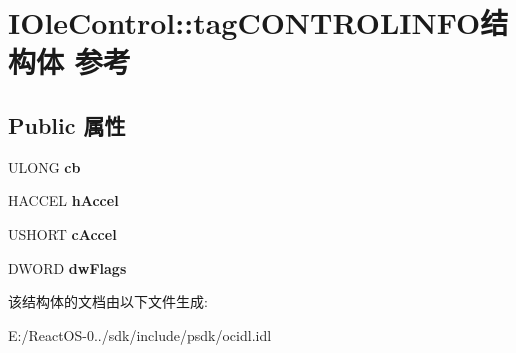 \hypertarget{struct_i_ole_control_1_1tag_c_o_n_t_r_o_l_i_n_f_o}{}\section{I\+Ole\+Control\+:\+:tag\+C\+O\+N\+T\+R\+O\+L\+I\+N\+F\+O结构体 参考}
\label{struct_i_ole_control_1_1tag_c_o_n_t_r_o_l_i_n_f_o}
\subsection*{Public 属性}
\begin{DoxyCompactItemize}
\item 
\mbox{\label{struct_i_ole_control_1_1tag_c_o_n_t_r_o_l_i_n_f_o_ac14aa7f3b4ac11bc6e73dceecc59d020}} 
U\+L\+O\+NG {\bfseries cb}
\item 
\mbox{\label{struct_i_ole_control_1_1tag_c_o_n_t_r_o_l_i_n_f_o_a7a132b9b62b9f8aefddced6b8f8f0316}} 
H\+A\+C\+C\+EL {\bfseries h\+Accel}
\item 
\mbox{\label{struct_i_ole_control_1_1tag_c_o_n_t_r_o_l_i_n_f_o_a5a7a344372a7aec7986678912c7a4b1d}} 
U\+S\+H\+O\+RT {\bfseries c\+Accel}
\item 
\mbox{\label{struct_i_ole_control_1_1tag_c_o_n_t_r_o_l_i_n_f_o_ac3d532234958b0ed3b7e7a92e2063869}} 
D\+W\+O\+RD {\bfseries dw\+Flags}
\end{DoxyCompactItemize}


该结构体的文档由以下文件生成\+:\begin{DoxyCompactItemize}
\item 
E\+:/\+React\+O\+S-\/0../sdk/include/psdk/ocidl.\+idl\end{DoxyCompactItemize}

